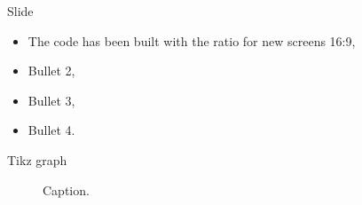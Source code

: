 


 \def\hasClickable{}

 
 
 
 
 

 
 




\ifx\currentAspect\oldAspect
	\def\sometext{The code has been built with the ratio for old screens 4:3}
\else
	\def\sometext{The code has been built with the ratio for new screens 16:9}
\fi



\begin{frame}{Slide }
\begin{itemize}
\setlength\itemsep{\fill}
\item \sometext,
\item Bullet 2,
\item Bullet 3,
\item Bullet 4.
\end{itemize}
\end{frame}


\begin{frame}{Tikz graph}
\begin{figure}[H]
\centering


\vspace{-10pt}
\caption{Caption.}
\end{figure}
\end{frame}


